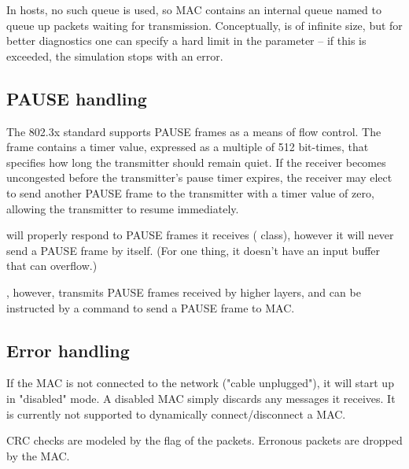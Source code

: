 In hosts, no such queue is used, so MAC contains an internal
queue named  to queue up packets waiting for transmission.
Conceptually,  is of infinite size, but for better diagnostics
one can specify a hard limit in the  parameter -- if this is
exceeded, the simulation stops with an error.

\subsection*{PAUSE handling}
\label{subsec:pause_handling}

The 802.3x standard supports PAUSE frames as a means of flow
control. The frame contains a timer value, expressed as a multiple
of 512 bit-times, that specifies how long the transmitter should
remain quiet. If the receiver becomes uncongested before the
transmitter's pause timer expires, the receiver may elect to send
another PAUSE frame to the transmitter with a timer value of zero,
allowing the transmitter to resume immediately.

 will properly respond to PAUSE frames it receives
( class),
however it will never send a PAUSE frame by itself. (For one thing,
it doesn't have an input buffer that can overflow.)

, however, transmits PAUSE frames received by higher layers,
and  can be instructed by a command to send a PAUSE frame to MAC.


\subsection*{Error handling}

If the MAC is not connected to the network ("cable unplugged"), it will
start up in "disabled" mode. A disabled MAC simply discards any messages
it receives. It is currently not supported to dynamically connect/disconnect
a MAC.

CRC checks are modeled by the  flag of the packets. Erronous
packets are dropped by the MAC.




